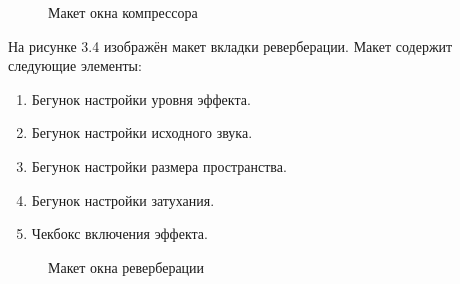 \begin{figure}[ht]
	\center{\texttt{[image: 2]}}
	\caption{Макет окна компрессора}
	\label{2:image}
\end{figure}

На рисунке 3.4 изображён макет вкладки реверберации. Макет содержит следующие элементы:
\begin{enumerate}
	\item Бегунок настройки уровня эффекта.
	\item Бегунок настройки исходного звука.
	\item Бегунок настройки размера пространства.
	\item Бегунок настройки затухания.
	\item Чекбокс включения эффекта.
\end{enumerate}

\begin{figure}[ht]
	\center{\texttt{[image: 3]}}
	\caption{Макет окна реверберации}
	\label{3:image}
\end{figure}
\clearpage